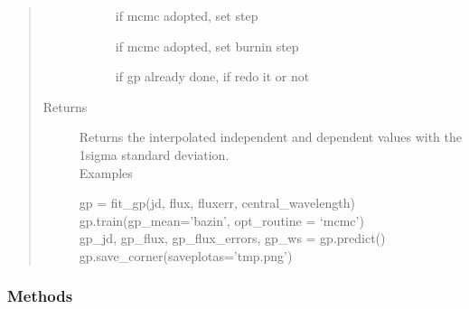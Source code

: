 \documentclass[letterpaper,10pt,english]{sphinxmanual}
\begin{document}
\begin{fulllineitems}
\begin{quote}
\begin{description}
\begin{description}
\item[{}] \leavevmode
if mcmc adopted, set step

\item[{}] \leavevmode
if mcmc adopted, set burnin step

\item[{}] \leavevmode
if gp already done, if redo it or not

\end{description}

\item[{Returns}] \leavevmode\begin{description}
\item[{Returns the interpolated independent and dependent values with the 1\sphinxhyphen{}sigma standard deviation.}] \leavevmode
\item[{Examples}] \leavevmode
\end{description}
\begin{quote}
\end{quote}
\begin{description}
\item[{gp = fit\_gp(jd, flux, fluxerr, central\_wavelength)}] \leavevmode
\item[{gp.train(gp\_mean=’bazin’, opt\_routine = ‘mcmc’)}] \leavevmode
\item[{gp\_jd, gp\_flux, gp\_flux\_errors, gp\_ws = gp.predict()}] \leavevmode
\item[{gp.save\_corner(saveplotas=’tmp.png’)}] \leavevmode
\end{description}

\end{description}\end{quote}
\subsubsection*{Methods}


\begin{savenotes}\sphinxatlongtablestart\begin{longtable}[c]{}
\hline

\endfirsthead

%
{}\\
\hline

\endhead


\end{longtable}
\end{savenotes}
\end{fulllineitems}
\end{document}
